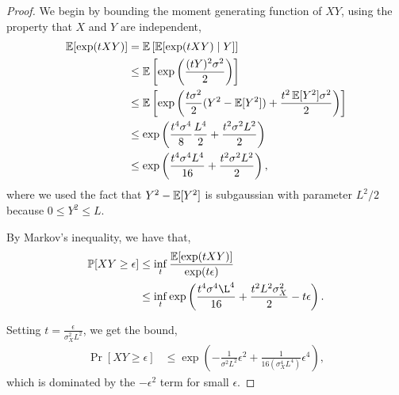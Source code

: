 \documentclass[tablecaption=bottom]{jmlr}
\begin{document}
\begin{proof}
  We begin by bounding the moment generating function of $XY$, using the property that $X$ and $Y$ are independent,
  \begin{align*}
    \operatorname{\mathbb{E}}[ \exp(t X Y) ] 
      &= \operatorname{\mathbb{E}}\left[ \operatorname{\mathbb{E}}[ \exp(t X Y) \mid Y ] \right] \\
      &\le \operatorname{\mathbb{E}}\left[ \exp\left(\frac{(tY)^2 \sigma^2}{2}\right) \right] \\
      &\le \operatorname{\mathbb{E}}\left[ \exp\left(\frac{t \sigma^2}{2} (Y^2 - \operatorname{\mathbb{E}}[Y^2]) + \frac{t^2 \operatorname{\mathbb{E}}[Y^2] \sigma^2}{2}\right) \right] \\
      &\le \exp\left(\frac{t^4 \sigma^4}{8} \frac{L^4}{2}  + \frac{t^2\sigma^2 L^2}{2}\right) \\
      &\le \exp\left(\frac{t^4 \sigma^4 L^4}{16}  + \frac{t^2 \sigma^2 L^2}{2}\right),
  \end{align*}
  where we used the fact that $Y^2 - \operatorname{\mathbb{E}}[Y^2]$ is subgaussian with parameter $L^2/2$ because $0 \le Y^2 \le L$.

  By Markov's inequality, we have that,
  \begin{align*}
    \Pr[ XY \ge \epsilon ] 
      &\le \inf_t \frac{\E[\exp(t XY)]}{\exp(t\epsilon)} \\
      &\le \inf_t \exp\left(\frac{t^4 \sigma^4 \L^4 }{16} + \frac{t^2 L^2 \sigma^2_X}{2} - t\epsilon\right).
  \end{align*}

  Setting $t = \frac{\epsilon}{\sigma^2_X L^2 }$, we get the bound,
  \begin{align*}
    \Pr[ XY \ge \epsilon ] 
      &\le 
        \exp\left( - \frac{1}{\sigma^2 L^2} \epsilon^{2} 
          + \frac{1}{16 (\sigma^4_X L^4)} \epsilon^{4} \right),
  \end{align*}
  which is dominated by the $-\epsilon^2$ term for small $\epsilon$.
\end{proof}
\end{document}
